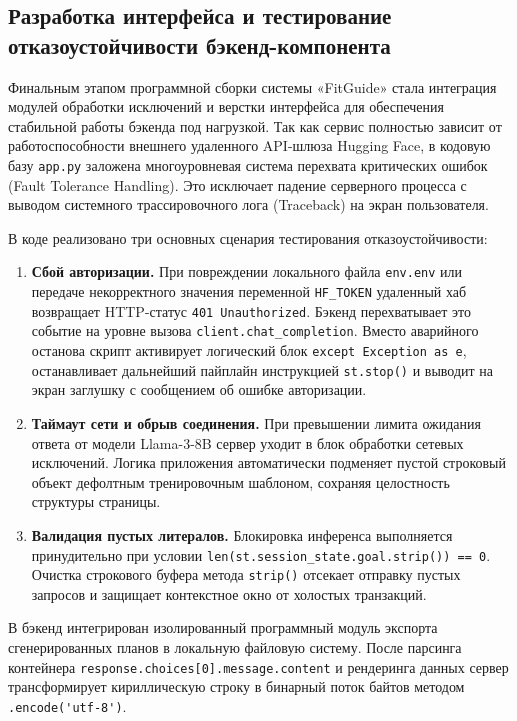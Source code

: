 \documentclass[14pt, a4paper]{extarticle}
\begin{document}
\subsection{Разработка интерфейса и тестирование отказоустойчивости бэкенд-компонента}

Финальным этапом программной сборки системы «FitGuide» стала интеграция модулей обработки исключений и верстки интерфейса для обеспечения стабильной работы бэкенда под нагрузкой. Так как сервис полностью зависит от работоспособности внешнего удаленного API-шлюза Hugging Face, в кодовую базу \texttt{app.py} заложена многоуровневая система перехвата критических ошибок (Fault Tolerance Handling). Это исключает падение серверного процесса с выводом системного трассировочного лога (Traceback) на экран пользователя.

В коде реализовано три основных сценария тестирования отказоустойчивости:
\begin{enumerate}
    \item \textbf{Сбой авторизации.} 
    При повреждении локального файла \texttt{env.env} или передаче некорректного значения переменной \verb|HF_TOKEN| удаленный хаб возвращает HTTP-статус \verb|401 Unauthorized|. Бэкенд перехватывает это событие на уровне вызова \verb|client.chat_completion|. Вместо аварийного останова скрипт активирует логический блок \verb|except Exception as e|, останавливает дальнейший пайплайн инструкцией \verb|st.stop()| и выводит на экран заглушку с сообщением об ошибке авторизации.

    \item \textbf{Таймаут сети и обрыв соединения.} 
    При превышении лимита ожидания ответа от модели Llama-3-8B сервер уходит в блок обработки сетевых исключений. Логика приложения автоматически подменяет пустой строковый объект дефолтным тренировочным шаблоном, сохраняя целостность структуры страницы.

\item \textbf{Валидация пустых литералов.} 
    Блокировка инференса выполняется принудительно при условии \texttt{len(st.session\_state.goal.strip()) == 0}. Очистка строкового буфера метода \texttt{strip()} отсекает отправку пустых запросов и защищает контекстное окно от холостых транзакций.
\end{enumerate}

В бэкенд интегрирован изолированный программный модуль экспорта сгенерированных планов в локальную файловую систему. После парсинга контейнера \verb|response.choices[0].message.content| и рендеринга данных сервер трансформирует кириллическую строку в бинарный поток байтов методом \verb|.encode('utf-8')|.
\end{document}

